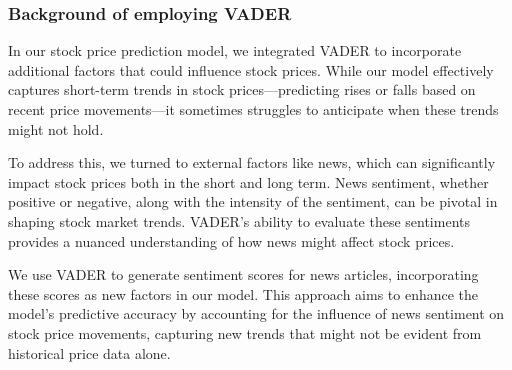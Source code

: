 \subsubsection{Background of employing VADER}

In our stock price prediction model, we integrated VADER to incorporate additional factors that could influence stock prices. 
While our model effectively captures short-term trends in stock prices—predicting rises or falls based on recent price movements—it sometimes struggles to anticipate when these trends might not hold.

To address this, we turned to external factors like news, which can significantly impact stock prices both in the short and long term. 
News sentiment, whether positive or negative, along with the intensity of the sentiment, can be pivotal in shaping stock market trends. 
VADER's ability to evaluate these sentiments provides a nuanced understanding of how news might affect stock prices.

We use VADER to generate sentiment scores for news articles, incorporating these scores as new factors in our model. 
This approach aims to enhance the model's predictive accuracy by accounting for the influence of news sentiment on stock price movements, capturing new trends that might not be evident from historical price data alone.
